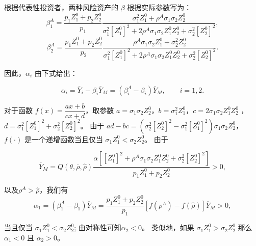 \documentclass[10.0pt]{article}
\begin{document}
根据代表性投资者，两种风险资产的 $\beta$ 根据实际参数写为：
\begin{equation*}
\beta_1^A = \dfrac{p_1 Z_1^0 + p_2 Z_2^0}{p_1} \dfrac{\sigma_1^2 Z_1^0 + \rho^A \sigma_1 \sigma_2 Z_2^0}{\sigma_1^2 \left[ Z_1^0 \right]^2 + 2 \rho^A \sigma_1 \sigma_2 Z_1^0 Z_2^0 + \sigma_2^2 \left[ Z_2^0 \right]^2}, 
\end{equation*}
\begin{equation*}
\beta_2^A = \dfrac{p_1 Z_1^0 + p_2 Z_2^0}{p_2} \dfrac{\rho^A \sigma_1 \sigma_2 Z_1^0 + \sigma_2^2 Z_2^0}{\sigma_1^2 \left[ Z_1^0 \right]^2 + 2 \rho^A \sigma_1 \sigma_2 Z_1^0 Z_2^0 + \sigma_2^2 \left[ Z_2^0 \right]^2}. 
\end{equation*}


因此，$ \alpha_i $ 由下式给出：

\begin{equation*}
\alpha_i = \overline{Y}_i - \beta_i \overline{Y}_{M} = (\beta_i^A - \beta_i) \overline{Y}_M, \qquad i = 1, 2.
\end{equation*}



对于函数 $ f (x) = \dfrac{a x + b}{c x + d} $，取参数  $ a = \sigma_1 \sigma_2 Z_2^0 $，$ b = \sigma_1^2 Z_1^0 $，$ c = 2 \sigma_1 \sigma_2 Z_1^0 Z_2^0 $ ，$ d = \sigma_1^2 \left[ Z_1^0 \right]^2 + \sigma_2^2 \left[ Z_2^0 \right]^2 $。 由于 $ a d - b c = \left( \sigma_2^2 \left[ Z_2^0 \right]^2 - \sigma_1^2 \left[ Z_1^0 \right]^2 \right) \sigma_1 \sigma_2 Z_2^0 $，  $ f (\cdot) $ 是一个递增函数当且仅当 $ \sigma_1 Z_1^0 < \sigma_2 Z_2^0 $。 由于

\begin{equation*}
\overline{Y}_M = Q (\theta, \overline{\rho}, {\hat \rho}) \dfrac{\alpha \left[ \left[ Z_1^0 \right]^2 + \rho^A \sigma_1 \sigma_2 Z_1^0 Z_2^0 + \sigma_2^2 \left[ Z_2^0 \right]^2 \right]}{p_1 Z_1^0 + p_2 Z_2^0} > 0, 
\end{equation*}


 以及$ \rho^A > \hat{\rho} $，我们有
\begin{equation*}
\alpha_1 = (\beta_1^A - \beta_1) \overline{Y}_M = \dfrac{p_1 Z_1^0 + p_2 Z_2^0}{p_1} \left[ f (\rho^A) - f (\hat{\rho}) \right]\overline{Y}_M > 0,
\end{equation*}


当且仅当 $ \sigma_1 Z_1^0 < \sigma_2 Z_2^0 $; 由对称性可知$ \alpha_2 < 0 $。 类似地，如果 $ \sigma_1 Z_1^0 > \sigma_2 Z_2^0 $ 那么 $ \alpha_1 < 0 $ 且 $ \alpha_2 > 0 $。
\end{document}
